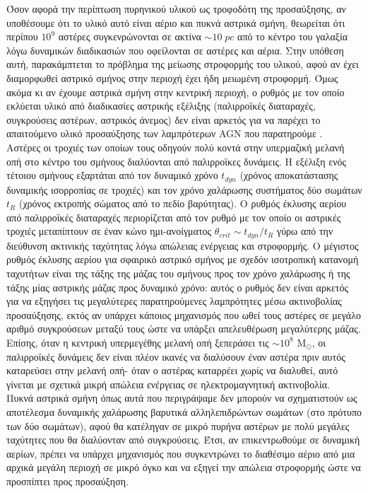 Όσον αφορά την περίπτωση πυρηνικού υλικού ως τροφοδότη της προσαύξησης, αν υποθέσουμε ότι το υλικό αυτό είναι αέριο και πυκνά αστρικά σμήνη, θεωρείται ότι περίπου $10^{9}$ αστέρες συγκενρώνονται σε ακτίνα $\sim 10 \; pc$ από το κέντρο του γαλαξία λόγω δυναμικών διαδικασιών που οφείλονται σε αστέρες και αέρια. Στην υπόθεση αυτή, παρακάμπτεται το πρόβλημα της μείωσης στροφορμής του υλικού, αφού αν έχει διαμορφωθεί αστρικό σμήνος στην περιοχή έχει ήδη μειωμένη στροφορμή. Όμως ακόμα κι αν έχουμε αστρικά σμήνη στην κεντρική περιοχή, ο ρυθμός με τον οποίο εκλύεται υλικό από διαδικασίες αστρικής εξέλιξης (παλιρροϊκές διαταραχές, συγκρούσεις αστέρων, αστρικός άνεμος) δεν είναι αρκετός για να παρέχει το απαιτούμενο υλικό προσαύξησης των λαμπρότερων \textlatin{AGN} που παρατηρούμε \cite{AccrPower}. \\
Αστέρες οι τροχιές των οποίων τους οδηγούν πολύ κοντά στην υπερμαζική μελανή οπή στο κέντρο του σμήνους διαλύονται από παλιρροϊκες δυνάμεις. Η εξέλιξη ενός τέτοιου σμήνους εξαρτάται από τον δυναμικό χρόνο $t_{dyn}$ (χρόνος αποκατάστασης δυναμικής ισορροπίας σε τροχιές) και τον χρόνο χαλάρωσης συστήματος δύο σωμάτων $t_{R}$ (χρόνος εκτροπής σώματος από το πεδίο βαρύτητας). Ο ρυθμός έκλυσης αερίου από παλιρροϊκές διαταραχές  
περιορίζεται από τον ρυθμό με τον οποίο οι αστρικές τροχιές μεταπίπτουν σε έναν κώνο 
ημι-ανοίγματος $\theta_{crit} \sim t_{dyn}/t_{R} $ γύρω από την διεύθυνση ακτινικής ταχύτητας λόγω απώλειας ενέργειας και στροφορμής. Ο μέγιστος ρυθμός έκλυσης αερίου για σφαιρικό αστρικό σμήνος με σχεδόν ισοτροπική κατανομή ταχυτήτων είναι της τάξης της μάζας του σμήνους προς τον χρόνο χαλάρωσης ή της τάξης μίας αστρικής μάζας προς δυναμικό χρόνο: αυτός ο ρυθμός δεν είναι αρκετός για να εξηγήσει τις μεγαλύτερες παρατηρούμενες λαμπρότητες μέσω ακτινοβολίας προσαύξησης, εκτός αν υπάρχει κάποιος μηχανισμός που ωθεί τους αστέρες σε μεγάλο αριθμό συγκρούσεων μεταξύ τους ώστε να υπάρξει απελευθέρωση μεγαλύτερης μάζας. Επίσης, όταν η κεντρική υπερμεγέθης μελανή οπή ξεπεράσει τις $\sim 10^8$ M$_\odot$, οι παλιρροϊκές δυνάμεις δεν είναι πλέον ικανές να διαλύσουν έναν αστέρα πριν αυτός καταρεύσει στην μελανή οπή- όταν ο αστέρας καταρρέει χωρίς να διαλυθεί, αυτό γίνεται με σχετικά μικρή απώλεια ενέργειας σε ηλεκτρομαγνητική ακτινοβολία\cite{AccrPower}. \\
Πυκνά αστρικά σμήνη όπως αυτά που περιγράψαμε δεν μπορούν να σχηματιστούν ως αποτέλεσμα δυναμικής χαλάρωσης βαρυτικά αλληλεπιδρώντων σωμάτων (στο πρότυπο των δύο σωμάτων), αφού θα κατέληγαν σε μικρό πυρήνα αστέρων με πολύ μεγάλες ταχύτητες που θα διαλύονταν από συγκρούσεις\cite{AccrPower}. Έτσι, αν επικεντρωθούμε σε δυναμική αερίων, πρέπει να υπάρχει μηχανισμός που συγκεντρώνει το διαθέσιμο αέριο από μια αρχικά μεγάλη περιοχή σε μικρό όγκο και να εξηγεί την απώλεια στροφορμής ώστε να προσπίπτει προς προσαύξηση. %

